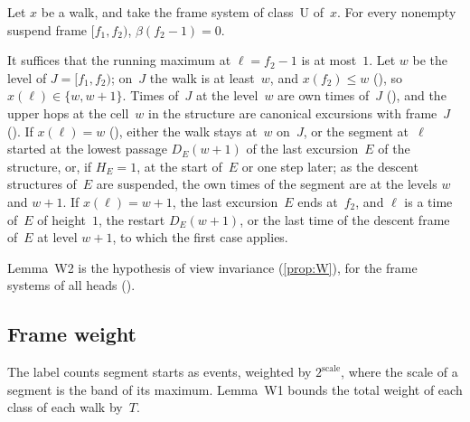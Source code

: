 \begin{lemma}\label{lem:W2b}
Let $x$ be a walk, and take the frame system of class~U of~$x$. For every nonempty suspend frame $[f_1,f_2)$,
$\beta(f_2-1)=0$.
\end{lemma}

\begin{outline}
It suffices that the running maximum at $\ell=f_2-1$ is at most~$1$. Let $w$ be the level of $J=[f_1,f_2)$; on~$J$ the walk is at
least~$w$, and $x(f_2)\le w$ (), so $x(\ell)\in\{w,w+1\}$. Times of~$J$ at the level~$w$ are own times of~$J$
(), and the upper hops at the cell~$w$ in the structure are canonical excursions with frame~$J$
(). If $x(\ell)=w$ (), either the walk stays at~$w$ on~$J$, or the segment at~$\ell$
started at the lowest passage $D_E(w+1)$ of the last excursion~$E$ of the structure, or, if $H_E=1$, at the start of~$E$ or
one step later; as the descent structures of~$E$ are suspended, the own times of the segment are at the levels $w$ and $w+1$. If $x(\ell)=w+1$, the last
excursion~$E$ ends at~$f_2$, and $\ell$ is a time of~$E$ of height~$1$, the restart $D_E(w+1)$, or the last time of the descent
frame of~$E$ at level $w+1$, to which the first case applies.
\end{outline}

Lemma~W2 is the hypothesis  of view invariance (\cref{prop:W}), for the frame systems of all heads
().

\subsection{Frame weight}\label{sec:ladders-weight}

The label counts segment starts as events, weighted by $2^{\text{scale}}$, where the scale of a segment is the band of its
maximum. Lemma~W1 bounds the total weight of each class of each walk by~$T$.

